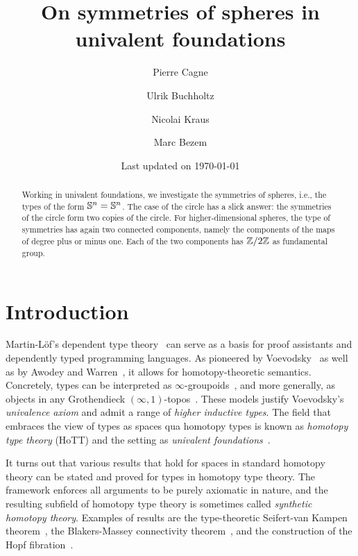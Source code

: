 \documentclass[english,a4paper]{lmcs}
\begin{document}
\title{On symmetries of spheres in univalent foundations}

\author{Pierre Cagne}
\address{Universitetet i Bergen}

\author{Ulrik Buchholtz}
\address{Technische Universit\"at Darmstadt}

\author{Nicolai Kraus}
\address{University of Nottingham}

\author{Marc Bezem}
\address{Universitetet i Bergen}

\date{\normalsize Last updated on \today}%

\begin{abstract}
  Working in univalent foundations,
  we investigate the symmetries of spheres, i.e., the types of the form
  ${\mathbb S^{n}} = {\mathbb S^{n}}$.
  The case of the circle has a slick answer:
  the symmetries of the circle form two copies of the circle.
  For higher-dimensional spheres, the type of symmetries has again two connected components, namely the components of the maps of degree plus or minus one.
  Each of the two components has $\mathbb{Z}/2\mathbb{Z}$ as fundamental group.
\end{abstract}

\maketitle

\section{Introduction}




Martin-L\"of's dependent type theory~\cite{Martin-Lof-1972} can serve as a basis for proof assistants and dependently typed programming languages.
As pioneered by Voevodsky~\cite{voevodsky_univalentfoundations} as well as by Awodey and Warren~\cite{awodeyWarren_HTmodelsOfIT}, it allows for homotopy-theoretic semantics.
Concretely, types can be interpreted as $\infty$-groupoids~\cite{Kapulkin2021}, and more generally,
as objects in any Grothendieck $(\infty,1)$-topos~\cite{shulman2019}.
These models justify Voevodsky's \emph{univalence axiom} and admit a range of \emph{higher inductive types}.
The field that embraces the view of types as spaces qua homotopy types is known as \emph{homotopy type theory} (HoTT) and the setting as \emph{univalent foundations}~\cite{HoTT}.

It turns out that various results that hold for spaces in standard homotopy theory can be stated and proved for types in homotopy type theory.
The framework enforces all arguments to be purely axiomatic in nature, and the resulting subfield of homotopy type theory is sometimes called \emph{synthetic homotopy theory}.
Examples of results are the type-theoretic Seifert-van Kampen theorem~\cite{houfavonia_et_al:LIPIcs:2016:6562}, the Blakers-Massey connectivity theorem~\cite{favonia_blakers}, and the construction of the Hopf fibration~\cite[Chp.~8.5]{HoTT}.
\end{document}
